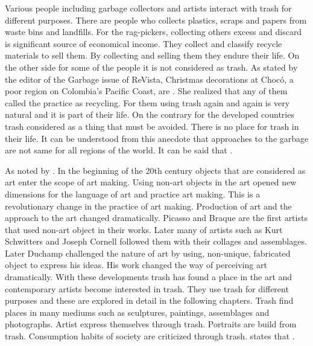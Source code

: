 Various people including garbage collectors and artists interact with trash for different purposes. There are people who collects plastics, scraps and papers from waste bins and landfills. For the rag-pickers, collecting others excess and discard is significant source of economical income. They collect and classify recycle materials to sell them. By collecting and selling them they endure their life. On the other side for some of the people it is not considered as trash. As stated by the editor of the Garbage issue of ReVista, Christmas decorations at Chocó, a poor region on Colombia’s Pacific Coast, are  \citep{erlick2015editorsletter}. She realized that any of them called the practice as recycling. For them using trash again and again is very natural and it is part of their life. On the contrary for the developed countries trash considered as a thing that must be avoided. There is no place for trash in their life. It can be understood from this anecdote that approaches to the garbage are not same for all regions of the world. It can be said that  \citep[xxvi]{zimring2012encyclopedia}.

As noted by \cite{pye2010trashculture} . In the beginning of the 20th century objects that are considered as art enter the scope of art making. Using non-art objects in the art opened new dimensions for the language of art and practice art making. This is a revolutionary change in the practice of art making. Production of art and the approach to the art changed dramatically. Picasso and Braque are the first artists that used non-art object in their works. Later many of artists such as Kurt Schwitters and Joseph Cornell followed them with their collages and assemblages. Later Duchamp challenged the nature of art by using, non-unique, fabricated object to express his ideas. His work changed the way of perceiving art dramatically. With these developments trash has found a place in the art and contemporary artists become interested in trash. They use trash for different purposes and these are explored in detail in the following chapters. Trash find places in many mediums such as sculptures, paintings, assemblages and photographs. Artist express themselves through trash. Portraits are build from trash. Consumption habits of society are criticized through trash. \cite[2]{pye2010trashculture} states that .



